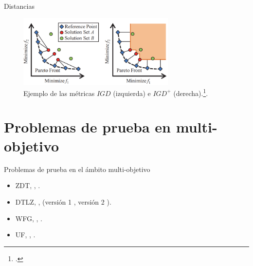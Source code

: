 \documentclass{beamer}
\begin{document}
\begin{frame}{Distancias}

\begin{table}[]
\end{table}
\begin{figure}[H]
\centering
\includegraphics[width=0.7\textwidth]{Images/igd.png}
\caption{\scriptsize Ejemplo de las métricas $IGD$ (izquierda) e $IGD^+$ (derecha).\footcite{ishibuchi2016sensitivity}.}
\end{figure}
\end{frame}



\section{Problemas de prueba en multi-objetivo}
\begin{frame}{Problemas de prueba en el ámbito multi-objetivo}
\begin{itemize}
   \item ZDT, \citeauthor{Joel:ZDT}, \citeyear{Joel:ZDT}.%
   \item DTLZ, \citeauthor{Joel:DTLZ_1}, (versión 1 \citeyear{Joel:DTLZ_1}, versión 2 \citeyear{Joel:DTLZ_2}).%
   \item WFG, \citeauthor{Joel:WFG_Main}, \citeyear{Joel:WFG_Main}.%
   \item UF, \citeauthor{Joel:CEC2009}, \citeyear{Joel:CEC2009}.%
\end{itemize}
\end{frame}
\end{document}
